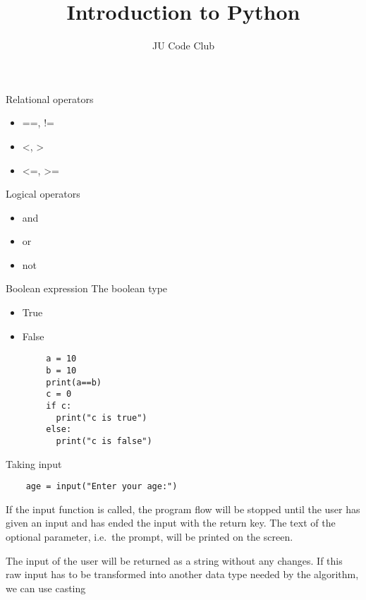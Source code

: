 \documentclass{beamer}
\title{Introduction to Python}
\author{JU Code Club}
\date{}
\begin{document}
\maketitle

\begin{frame}[fragile]{Relational operators}
	\begin{itemize}
		\item ==, !=
		\item \textless, \textgreater
		\item \textless=, \textgreater=
	\end{itemize}
\end{frame}

\begin{frame}[fragile]{Logical operators}
	\begin{itemize}
		\item and
		\item or
		\item not
	\end{itemize}
\end{frame}

\begin{frame}[fragile]{Boolean expression}
	\Large{The boolean type}
	\begin{itemize}
		\item True
		\item False
	\end{itemize}

	\begin{verbatim}
		a = 10
		b = 10
		print(a==b)
		c = 0
		if c:
		  print("c is true")
		else:
		  print("c is false")
	\end{verbatim}
\end{frame}

\begin{frame}[fragile]{Taking input}
	\begin{verbatim}
	age = input("Enter your age:")
	\end{verbatim}
	If the input function is called, the program flow will be stopped until the user has given an input and has ended the input with the return key. The text of the optional parameter, i.e.\ the prompt, will be printed on the screen.
	
	The input of the user will be returned as a string without any changes. If this raw input has to be transformed into another data type needed by the algorithm, we can use casting 
\end{frame}
\end{document}
